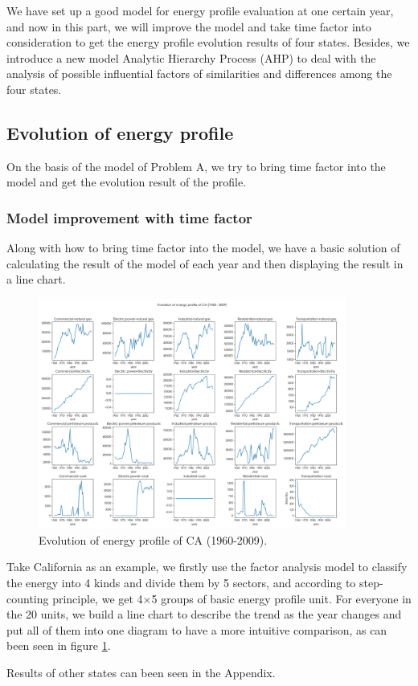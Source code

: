 \documentclass[a4paper,11pt]{article}
\begin{document}
\par We have set up a good model for energy profile evaluation at one certain year, and now in this part, we will improve the model and take time factor into consideration to get the energy profile evolution results of four states. Besides,
we introduce a new model Analytic Hierarchy Process (AHP) to deal with the analysis of possible influential factors of similarities and differences among the four states.


\subsection{Evolution of energy profile}
\par On the basis of the model of Problem A, we try to bring time factor into the model and get the evolution result of the profile. 

\subsubsection{Model improvement with time factor}
\par Along with how to bring time factor into the model, we have a basic solution of calculating the result of the model of each year and then displaying the result in a line chart. 

\begin{figure}[h]%
    \centering 
    \includegraphics[width=0.9\textwidth]{./Pic/part-2-CA.png}
    \caption{Evolution of energy profile of CA (1960-2009).}
    \label{fig:part-2-CA}  
\end{figure}

\par Take California as an example, we firstly use the factor analysis model to classify the energy into 4 kinds and divide them by 5 sectors, and according to step-counting principle, we get 4$\times$5 groups of basic energy profile unit. For everyone in the 20 units, we build a line chart to describe the trend as the year changes and put all of them into one diagram to have a more intuitive comparison, as can been seen in figure \ref{fig:part-2-CA}.  
\par Results of other states can been seen in the Appendix. 
\end{document}
